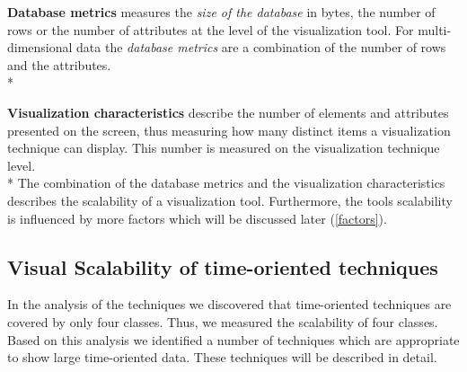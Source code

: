\textbf{Database metrics} measures the \textit{size of the database} in bytes, the number of rows or the number of attributes at the level of the visualization tool. For multi-dimensional data the \textit{database metrics} are a combination of the number of rows and the attributes. \\*

\textbf{Visualization characteristics} describe the number of elements and attributes presented on the screen, thus measuring how many distinct items a visualization technique can display. This number is measured on the visualization technique level.
\\*
The combination of the database metrics and the visualization characteristics describes the scalability of a visualization tool. Furthermore, the tools scalability is influenced by more factors which will be discussed later (\ref{factors}).

\subsection{Visual Scalability of time-oriented techniques}
In the analysis of the techniques we discovered that time-oriented techniques are covered by only four classes. Thus, we measured the scalability of four classes. 
 Based on this analysis we identified a number of  techniques which are appropriate to show large time-oriented data. These techniques will be described in detail.

